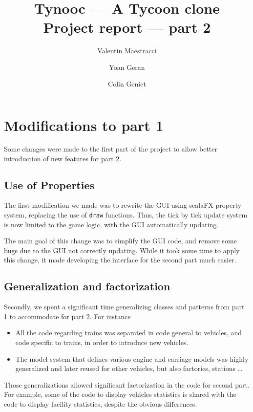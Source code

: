\documentclass{article}
\begin{document}
\title{Tynooc --- A Tycoon clone \\ \large{Project report --- part 2}}
\author{Valentin Maestracci \and Yoan Geran \and Colin Geniet}
\maketitle

\tableofcontents

\section{Modifications to part 1}
Some changes were made to the first part of the project to allow better introduction of new features for part 2.

\subsection{Use of Properties}
The first modification we made was to rewrite the GUI using scalaFX property system,
replacing the use of \verb|draw| functions.
Thus, the tick by tick update system is now limited to the game logic, with the GUI automatically updating.

The main goal of this change was to simplify the GUI code, and remove some bugs due to the GUI
not correctly updating. While it took some time to apply this change, it made developing the interface
for the second part much easier.

\subsection{Generalization and factorization}
Secondly, we spent a significant time generalizing classes and patterns from part 1 to accommodate for part 2.
For instance
\begin{itemize}
\item All the code regarding trains was separated in code general to vehicles, and code specific to trains,
in order to introduce new vehicles.
\item The model system that defines various engine and carriage models was highly generalized and later
reused for other vehicles, but also factories, stations \dots
\end{itemize}
Those generalizations allowed significant factorization in the code for second part.
For example, some of the code to display vehicles statistics is shared with the code to display facility statistics,
despite the obvious differences.
\end{document}
